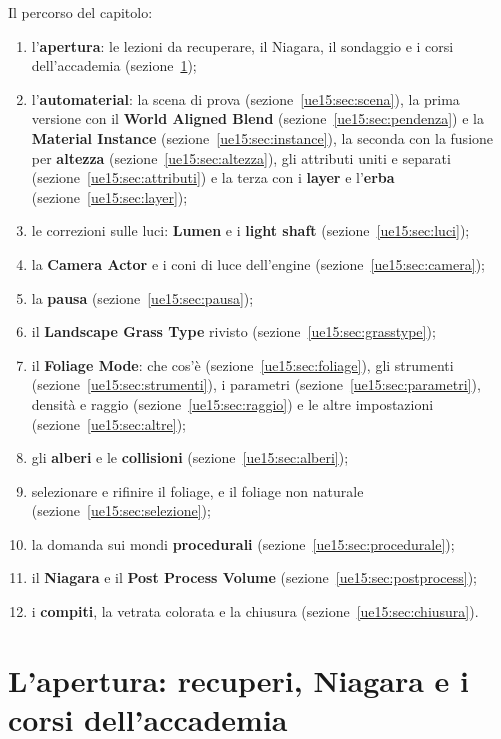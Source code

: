 Il percorso del capitolo:
\begin{enumerate}
  \item l'\textbf{apertura}: le lezioni da recuperare, il Niagara, il sondaggio e i corsi
        dell'accademia (sezione~\ref{ue15:sec:apertura});
  \item l'\textbf{automaterial}: la scena di prova (sezione~\ref{ue15:sec:scena}), la prima
        versione con il \textbf{World Aligned Blend} (sezione~\ref{ue15:sec:pendenza}) e la
        \textbf{Material Instance} (sezione~\ref{ue15:sec:instance}), la seconda con
        la fusione per \textbf{altezza} (sezione~\ref{ue15:sec:altezza}), gli attributi
        uniti e separati (sezione~\ref{ue15:sec:attributi}) e la terza con i
        \textbf{layer} e l'\textbf{erba} (sezione~\ref{ue15:sec:layer});
  \item le correzioni sulle luci: \textbf{Lumen} e i \textbf{light shaft}
        (sezione~\ref{ue15:sec:luci});
  \item la \textbf{Camera Actor} e i coni di luce dell'engine
        (sezione~\ref{ue15:sec:camera});
  \item la \textbf{pausa} (sezione~\ref{ue15:sec:pausa});
  \item il \textbf{Landscape Grass Type} rivisto (sezione~\ref{ue15:sec:grasstype});
  \item il \textbf{Foliage Mode}: che cos'è (sezione~\ref{ue15:sec:foliage}), gli
        strumenti (sezione~\ref{ue15:sec:strumenti}), i parametri
        (sezione~\ref{ue15:sec:parametri}), densità e raggio
        (sezione~\ref{ue15:sec:raggio}) e le altre impostazioni
        (sezione~\ref{ue15:sec:altre});
  \item gli \textbf{alberi} e le \textbf{collisioni} (sezione~\ref{ue15:sec:alberi});
  \item selezionare e rifinire il foliage, e il foliage non naturale
        (sezione~\ref{ue15:sec:selezione});
  \item la domanda sui mondi \textbf{procedurali} (sezione~\ref{ue15:sec:procedurale});
  \item il \textbf{Niagara} e il \textbf{Post Process Volume}
        (sezione~\ref{ue15:sec:postprocess});
  \item i \textbf{compiti}, la vetrata colorata e la chiusura
        (sezione~\ref{ue15:sec:chiusura}).
\end{enumerate}

\section{L'apertura: recuperi, Niagara e i corsi dell'accademia}
\label{ue15:sec:apertura}

